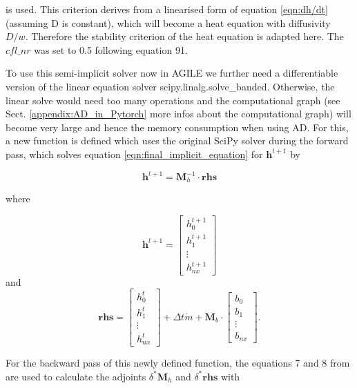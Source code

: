 \documentclass[journal abbreviation, manuscript]{copernicus}
\begin{document}
\noindent is used. This criterion derives from a linearised form of equation \ref{eqn:dh/dt} (assuming D is constant), which will become a heat equation with diffusivity $D/w$. Therefore the stability criterion of the heat equation is adapted here. The $cfl\_nr$ was set to 0.5 following \cite{Hindmarsh2001} equation 91.

To use this semi-implicit solver now in AGILE we further need a differentiable version of the linear equation solver \textsf{scipy.linalg.solve\_banded}. Otherwise, the linear solve would need too many operations and the computational graph (see Sect. \ref{appendix:AD_in_Pytorch} more infos about the computational graph) will become very large and hence the memory consumption when using AD. For this, a new function is defined which uses the original \textsf{SciPy} solver during the forward pass, which solves equation \ref{eqn:final_implicit_equation} for $\boldsymbol{h}^{t+1}$ by

\begin{equation}
    \boldsymbol{h}^{t+1} = \boldsymbol{M}_h^{-1} \cdot \boldsymbol{rhs}
\end{equation}

\noindent where

\begin{equation}
    \boldsymbol{h}^{t+1} =
    \begin{bmatrix}
        h_{0}^{t+1} \\
        h_{1}^{t+1} \\
        \vdots \\
        h_{nx}^{t+1}
    \end{bmatrix}
\end{equation}
\noindent and
\begin{equation}
    \boldsymbol{rhs} = \begin{bmatrix}
        h_{0}^{t} \\
        h_{1}^{t} \\
        \vdots \\
        h_{nx}^{t}
    \end{bmatrix}
    + \Delta t \Dot{m} + \boldsymbol{M}_b \cdot
    \begin{bmatrix}
        b_{0} \\
        b_{1} \\
        \vdots \\
        b_{nx}
    \end{bmatrix}.
\end{equation}

For the backward pass of this newly defined function, the equations 7 and 8 from \cite{Goldberg2013} are used to calculate the adjoints $\delta^*\boldsymbol{M}_h$ and $\delta^* \boldsymbol{rhs}$ with
\end{document}
